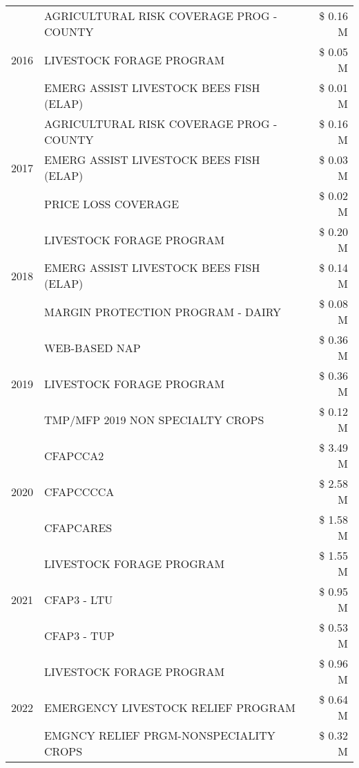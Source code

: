 \begin{tabular}{llr}
\cline{1-3}
\multirow[t]{3}{*}{2016} & AGRICULTURAL RISK COVERAGE PROG - COUNTY & \$ 0.16 M \\
 & LIVESTOCK FORAGE PROGRAM & \$ 0.05 M \\
 & EMERG ASSIST LIVESTOCK BEES FISH (ELAP) & \$ 0.01 M \\
\cline{1-3}
\multirow[t]{3}{*}{2017} & AGRICULTURAL RISK COVERAGE PROG - COUNTY & \$ 0.16 M \\
 & EMERG ASSIST LIVESTOCK BEES FISH (ELAP) & \$ 0.03 M \\
 & PRICE LOSS COVERAGE & \$ 0.02 M \\
\cline{1-3}
\multirow[t]{3}{*}{2018} & LIVESTOCK FORAGE PROGRAM & \$ 0.20 M \\
 & EMERG ASSIST LIVESTOCK BEES FISH (ELAP) & \$ 0.14 M \\
 & MARGIN PROTECTION PROGRAM - DAIRY & \$ 0.08 M \\
\cline{1-3}
\multirow[t]{3}{*}{2019} & WEB-BASED NAP & \$ 0.36 M \\
 & LIVESTOCK FORAGE PROGRAM & \$ 0.36 M \\
 & TMP/MFP 2019 NON SPECIALTY CROPS & \$ 0.12 M \\
\cline{1-3}
\multirow[t]{3}{*}{2020} & CFAPCCA2 & \$ 3.49 M \\
 & CFAPCCCCA & \$ 2.58 M \\
 & CFAPCARES & \$ 1.58 M \\
\cline{1-3}
\multirow[t]{3}{*}{2021} & LIVESTOCK FORAGE PROGRAM & \$ 1.55 M \\
 & CFAP3 - LTU & \$ 0.95 M \\
 & CFAP3 - TUP & \$ 0.53 M \\
\cline{1-3}
\multirow[t]{3}{*}{2022} & LIVESTOCK FORAGE PROGRAM & \$ 0.96 M \\
 & EMERGENCY LIVESTOCK RELIEF PROGRAM & \$ 0.64 M \\
 & EMGNCY RELIEF PRGM-NONSPECIALITY CROPS & \$ 0.32 M \\
\cline{1-3}
\bottomrule
\end{tabular}
